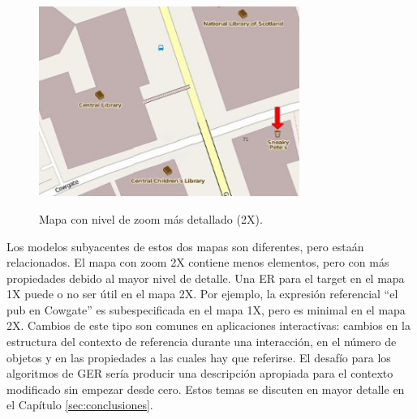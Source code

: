 \begin{figure}[H]
\begin{center}
\includegraphics[width=8.5cm]{images/with-zoom.jpg}\\[0pt]
\caption{Mapa con nivel de zoom m\'as detallado (2X).}
\label{fig-with-zoom}
\end{center}
\end{figure}


 Los modelos subyacentes de estos dos mapas son diferentes, pero esta\'an relacionados. El mapa con zoom 2X contiene menos elementos, pero con m\'as propiedades debido al mayor nivel de detalle. Una ER para el target en el mapa 1X puede o no ser \'util en el mapa 2X. Por ejemplo, la expresi\'on referencial ``el pub en Cowgate'' es subespecificada en el mapa 1X, pero es minimal en el mapa 2X. Cambios de este tipo son comunes en aplicaciones interactivas: cambios en la estructura del contexto de referencia durante una interacci\'on, en el n\'umero de objetos y en las propiedades a las cuales hay que referirse. El desaf\'{i}o para los algoritmos de GER ser\'{i}a producir una descripci\'on apropiada para el contexto modificado sin empezar desde cero. Estos temas se discuten en mayor detalle en el Cap\'itulo \ref{sec:conclusiones}. 

